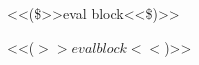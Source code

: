 
{\mktsStyleCode{}<<(\$>>eval block<<\$)>>}\mktsShowpar\par
{\mktsStyleCode{}<<($>>eval block<<$)>>}\mktsShowpar\par


